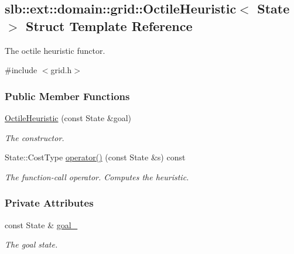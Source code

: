 \hypertarget{structslb_1_1ext_1_1domain_1_1grid_1_1OctileHeuristic}{}\subsection{slb\+:\+:ext\+:\+:domain\+:\+:grid\+:\+:Octile\+Heuristic$<$ State $>$ Struct Template Reference}
\label{structslb_1_1ext_1_1domain_1_1grid_1_1OctileHeuristic}


The octile heuristic functor.  




{\ttfamily \#include $<$grid.\+h$>$}

\subsubsection*{Public Member Functions}
\begin{DoxyCompactItemize}
\item 
\hyperlink{structslb_1_1ext_1_1domain_1_1grid_1_1OctileHeuristic_a75b0c3549970f0f218481061613fb380}{Octile\+Heuristic} (const State \&goal)
\begin{DoxyCompactList}\small\item\em The constructor. \end{DoxyCompactList}\item 
State\+::\+Cost\+Type \hyperlink{structslb_1_1ext_1_1domain_1_1grid_1_1OctileHeuristic_a94b66bd3f3e1374743238615694eac8d}{operator()} (const State \&s) const 
\begin{DoxyCompactList}\small\item\em The function-\/call operator. Computes the heuristic. \end{DoxyCompactList}\end{DoxyCompactItemize}
\subsubsection*{Private Attributes}
\begin{DoxyCompactItemize}
\item 
const State \& \hyperlink{structslb_1_1ext_1_1domain_1_1grid_1_1OctileHeuristic_ac3a1e0b98bfd9f70d42b697440b2b487}{goal\+\_\+}\hypertarget{structslb_1_1ext_1_1domain_1_1grid_1_1OctileHeuristic_ac3a1e0b98bfd9f70d42b697440b2b487}{}\label{structslb_1_1ext_1_1domain_1_1grid_1_1OctileHeuristic_ac3a1e0b98bfd9f70d42b697440b2b487}

\begin{DoxyCompactList}\small\item\em The goal state. \end{DoxyCompactList}\end{DoxyCompactItemize}


